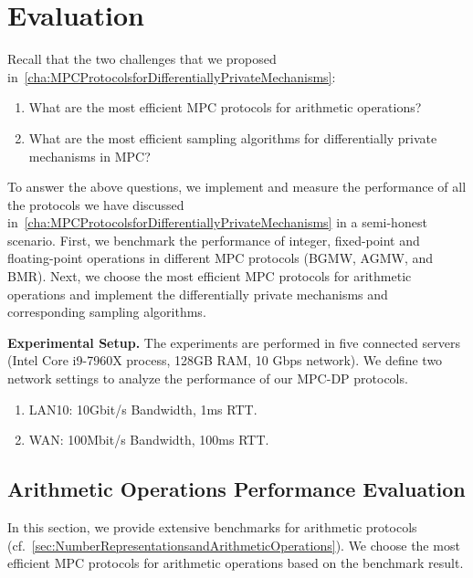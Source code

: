 \chapter{Evaluation}
\label{cha:evaluation}

Recall that the two challenges that we proposed in~\autoref{cha:MPCProtocolsforDifferentiallyPrivateMechanisms}:
\begin{enumerate}
    \item What are the most efficient MPC protocols for arithmetic operations?
    \item What are the most efficient sampling algorithms for differentially private mechanisms in MPC?
\end{enumerate}

To answer the above questions, we implement and measure the performance of all the protocols we have discussed in~\autoref{cha:MPCProtocolsforDifferentiallyPrivateMechanisms} in a semi-honest scenario.
First, we benchmark the performance of integer, fixed-point and floating-point operations in different MPC protocols (BGMW, AGMW, and BMR).
Next, we choose the most efficient MPC protocols for arithmetic operations and implement the differentially private mechanisms and corresponding sampling algorithms.



\textbf{Experimental Setup.}
The experiments are performed in five connected servers (Intel Core i9-7960X process, 128GB RAM, 10 Gbps network). We define two network settings to analyze the performance of our MPC-DP protocols.
\begin{enumerate}
    \item LAN10: 10Gbit/s Bandwidth, 1ms RTT.
    \item WAN: 100Mbit/s Bandwidth, 100ms RTT.
\end{enumerate}

\section{Arithmetic Operations Performance Evaluation}
\label{sec:ArithmeticOperationsPerformanceEvaluation}
In this section, we provide extensive benchmarks for arithmetic protocols (cf.~\autoref{sec:NumberRepresentationsandArithmeticOperations}).
We choose the most efficient MPC protocols for arithmetic operations based on the benchmark result.


